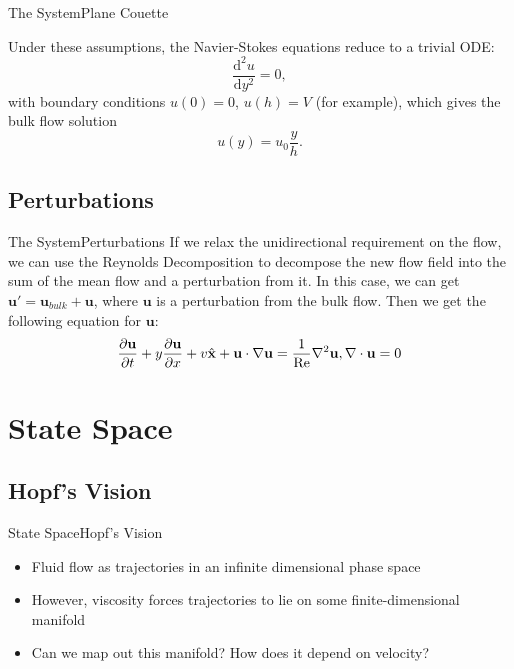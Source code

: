 \documentclass[10pt]{beamer}
\newcommand{\Vector}[1]{\mathbf{#1}}
\newcommand{\del}{\partial}
\begin{document}
\begin{frame}{The System}{Plane Couette}

Under these assumptions, the Navier-Stokes equations reduce to a trivial ODE:
\begin{equation}
\dfrac{\mathrm{d}^2 u}{\mathrm{d}y^2} = 0,
\end{equation}
with boundary conditions $u(0) = 0$, $u(h) = V$ (for example), which gives the bulk flow solution
\begin{equation}
u(y) = u_0 \dfrac{y}{h}.
\end{equation}
\end{frame}

\subsection{Perturbations}
\begin{frame}{The System}{Perturbations}
If we relax the unidirectional requirement on the flow, we can use the Reynolds Decomposition to decompose the new flow field into the sum of the mean flow and a perturbation from it. In this case, we can get $\Vector{u}' = \Vector{u}_{bulk} + \Vector{u}$, where $\Vector{u}$ is a perturbation from the bulk flow. Then we get the following equation for $\Vector{u}$:
\begin{equation}
\dfrac{\del \Vector{u}}{\del t} + y\dfrac{\del \Vector{u}}{\del x} + v\hat{\Vector{x}} + \Vector{u}\cdot\nabla\Vector{u} = \dfrac{1}{\mathrm{Re}}\nabla^2\Vector{u},\hfill \nabla\cdot\Vector{u} = 0
\end{equation} 
\end{frame}

\section{State Space}
\subsection{Hopf's Vision}
\begin{frame}{State Space}{Hopf's Vision}
\begin{itemize}
\item<1-> Fluid flow as trajectories in an infinite dimensional phase space
\item<2-> However, viscosity forces trajectories to lie on some finite-dimensional manifold
\item<3-> Can we map out this manifold? How does it depend on velocity?
\end{itemize}
\end{frame}
\end{document}
